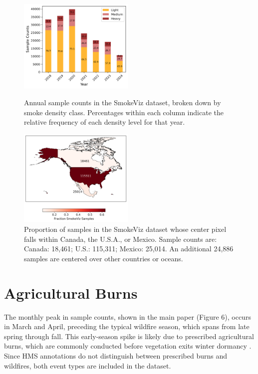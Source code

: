\documentclass{article}
\begin{document}
\begin{figure}[!htb]
    \parbox{\textwidth}{
      \parbox{0.49\textwidth}{
        \centering
        \includegraphics[width=0.49\textwidth]{stat_figs/sample_count_per_yr_percentages.png}
        \caption{Annual sample counts in the SmokeViz dataset, broken down by smoke density class. Percentages within each column indicate the relative frequency of each density level for that year.}
        \label{count_per_yr}
      }
    \hspace{0.01\textwidth}
      \parbox{0.49\textwidth}{
        \centering
        \includegraphics[width=0.49\textwidth]{stat_figs/sample_percent_country.png}
        \caption{Proportion of samples in the SmokeViz dataset whose center pixel falls within Canada, the U.S.A., or Mexico. Sample counts are: Canada: 18,461; U.S.: 115,311; Mexico: 25,014. An additional 24,886 samples are centered over other countries or oceans.}
        \label{count_per_country}
      }
    }
\end{figure}

\section{Agricultural Burns}

The monthly peak in sample counts, shown in the main paper (Figure 6), occurs in March and April, preceding the typical wildfire season, which spans from late spring through fall. This early-season spike is likely due to prescribed agricultural burns, which are commonly conducted before vegetation exits winter dormancy \cite{ag_fire}. Since HMS annotations do not distinguish between prescribed burns and wildfires, both event types are included in the dataset.
\end{document}
